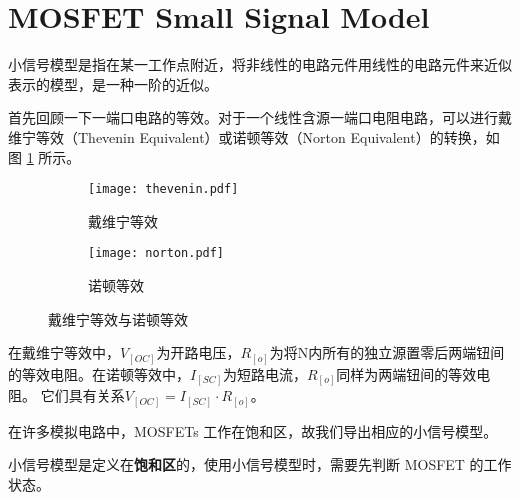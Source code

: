 \section{MOSFET Small Signal Model}

小信号模型是指在某一工作点附近，将非线性的电路元件用线性的电路元件来近似表示的模型，是一种一阶的近似。

首先回顾一下一端口电路的等效。对于一个线性含源一端口电阻电路，可以进行戴维宁等效（Thevenin Equivalent）或诺顿等效（Norton Equivalent）的转换，如图 \ref{fig:thevenin-norton-equivalent} 所示。
\begin{figure}[!htb]
    \centering
    \begin{subfigure}[b]{\textwidth}
        \centering
        \texttt{[image: thevenin.pdf]}
        \caption{戴维宁等效}
    \end{subfigure}
    \begin{subfigure}[b]{\linewidth}
        \centering
        \texttt{[image: norton.pdf]}
        \caption{诺顿等效}
    \end{subfigure}
    \caption{戴维宁等效与诺顿等效}
    \label{fig:thevenin-norton-equivalent}
\end{figure}

在戴维宁等效中，$V_[OC]$为开路电压，$R_[o]$为将N内所有的独立源置零后两端钮间的等效电阻。在诺顿等效中，$I_[SC]$为短路电流，$R_[o]$同样为两端钮间的等效电阻。
它们具有关系$V_[OC] = I_[SC] \cdot R_[o]$。

在许多模拟电路中，MOSFETs 工作在饱和区，故我们导出相应的小信号模型。
\begin{hint}
    小信号模型是定义在\textbf{饱和区}的，使用小信号模型时，需要先判断 MOSFET 的工作状态。
\end{hint}
